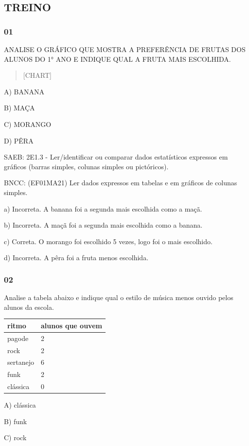 \subsection{TREINO}\label{treino-6}

\subsubsection{01}\label{section-84}

ANALISE O GRÁFICO QUE MOSTRA A PREFERÊNCIA DE FRUTAS DOS ALUNOS DO 1°
ANO E INDIQUE QUAL A FRUTA MAIS ESCOLHIDA.

\begin{quote}
{{[}CHART{]}}
\end{quote}

A) BANANA

B) MAÇA

C) MORANGO

D) PÊRA

SAEB: 2E1.3 - Ler/identificar ou comparar dados estatísticos expressos
em gráficos (barras simples, colunas simples ou pictóricos).

BNCC: (EF01MA21) Ler dados expressos em tabelas e em gráficos de colunas
simples.

a) Incorreta. A banana foi a segunda mais escolhida como a maçã.

b) Incorreta. A maçã foi a segunda mais escolhida como a banana.

c) Correta. O morango foi escolhido 5 vezes, logo foi o mais escolhido.

d) Incorreta. A pêra foi a fruta menos escolhida.

\subsubsection{02}\label{section-85}

Analise a tabela abaixo e indique qual o estilo de música menos ouvido
pelos alunos da escola.

\begin{longtable}[]{@{}ll@{}}
\toprule
ritmo & alunos que ouvem\tabularnewline
\midrule
\endhead
pagode & 2\tabularnewline
rock & 2\tabularnewline
sertanejo & 6\tabularnewline
funk & 2\tabularnewline
clássica & 0\tabularnewline
\bottomrule
\end{longtable}

A) clássica

B) funk

C) rock

